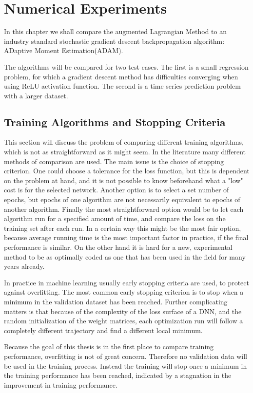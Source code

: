 \chapter{Numerical Experiments}
\label{cha:3}
In this chapter we shall compare the augmented Lagrangian Method to an industry standard stochastic gradient descent backpropagation algorithm: ADaptive Moment Estimation(ADAM). 

The algorithms will be compared for two test cases. The first is a small regression problem, for which a gradient descent method has difficulties converging when using ReLU activation function. The second is a time series prediction problem with a larger dataset.

\section{Training Algorithms and Stopping Criteria}
This section will discuss the problem of comparing different training algorithms, which is not as straightforward as it might seem. In the literature many different methods of comparison are used. The main issue is the choice of stopping criterion. One could choose a tolerance for the loss function, but this is dependent on the problem at hand, and it is not possible to know beforehand what a "low" cost is for the selected network. Another option is to select a set number of epochs, but epochs of one algorithm are not necessarily equivalent to epochs of another algorithm. Finally the most straightforward option would be to let each algorithm run for a specified amount of time, and compare the loss on the training set after each run. In a certain way this might be the most fair option, because average running time is the most important factor in practice, if the final performance is similar. On the other hand it is hard for a new, experimental method to be as optimally coded as one that has been used in the field for many years already.

In practice in machine learning usually early stopping criteria are used, to protect against overfitting. The most common early stopping criterion is to stop when a minimum in the validation dataset has been reached. Further complicating matters is that because of the complexity of the loss surface of a DNN, and the random initialization of the weight matrices, each optimization run will follow a completely different trajectory and find a different local minimum.

Because the goal of this thesis is in the first place to compare training performance, overfitting is not of great concern. Therefore no validation data will be used in the training process. Instead the training will stop once a minimum in the training performance has been reached, indicated by a stagnation in the improvement in training performance.

